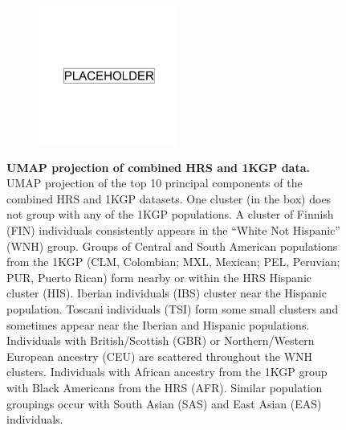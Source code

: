 \begin{figure}[ht]
    \centering
    \begin{subfigure}{\textwidth}
    \includegraphics[width=0.5\textwidth]{placeholder.png}
    \end{subfigure}
    \caption[UMAP projection of combined HRS and 1KGP data]{\textbf{UMAP projection of combined HRS and 1KGP data.} UMAP projection of the top 10 principal components of the combined HRS and 1KGP datasets. One cluster (in the box) does not group with any of the 1KGP populations. A cluster of Finnish (FIN) individuals consistently appears in the ``White Not Hispanic'' (WNH) group. Groups of Central and South American populations from the 1KGP (CLM, Colombian; MXL, Mexican; PEL, Peruvian; PUR, Puerto Rican) form nearby or within the HRS Hispanic cluster (HIS). Iberian individuals (IBS) cluster near the Hispanic population. Toscani individuals (TSI) form some small clusters and sometimes appear near the Iberian and Hispanic populations. Individuals with British/Scottish (GBR) or Northern/Western European ancestry (CEU) are scattered throughout the WNH clusters. Individuals with African ancestry from the 1KGP group with Black Americans from the HRS (AFR). Similar population groupings occur with South Asian (SAS) and East Asian (EAS) individuals.}
    \label{fig:supp_hrs_1000g}
\end{figure}

\newpage

